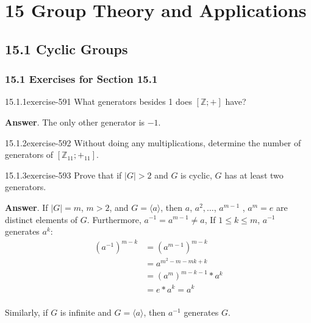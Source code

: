 \documentclass[twoside,10pt,]{book}
\numberwithin{equation}{section}
\begin{document}
\chapter*{15 Group Theory and Applications}
\section*{15.1 Cyclic Groups}
\subsection*{15.1 Exercises for Section 15.1}
\begin{divisionsolution}{15.1.1}{}{exercise-591}%
\hypertarget{p-5333}{}%
What generators besides 1 does \([\mathbb{Z}; +]\) have?%
\par\smallskip%
\noindent\textbf{Answer}.\quad%
\hypertarget{p-5334}{}%
The only other generator is \(-1\).%
\end{divisionsolution}%
\begin{divisionsolution}{15.1.2}{}{exercise-592}%
\hypertarget{p-5335}{}%
Without doing any multiplications, determine the number of generators of  \([\mathbb{Z}_{11}; +_{11}]\).%
\end{divisionsolution}%
\begin{divisionsolution}{15.1.3}{}{exercise-593}%
\hypertarget{p-5336}{}%
Prove that if \(\lvert G \rvert >2\) and \(G\) is cyclic, \(G\) has at least two generators.%
\par\smallskip%
\noindent\textbf{Answer}.\quad%
\hypertarget{p-5337}{}%
If  \(\lvert G \rvert = m\), \(m>2\), and \(G = \langle a \rangle\), then \(a\), \(a^2,\ldots\), \(a^{m-1}\) , \(a^m=e\) are distinct elements of \(G\). Furthermore, \(a^{-1}= a^{m-1}\neq a\),  If \(1 \leq k \leq m\), \(a^{-1}\) generates \(a^k\):%
\begin{equation*}
\begin{split}
\left(a^{-1}\right)^{m-k} &= \left(a^{m-1}\right)^{m-k}\\
& = a^{m^2-m-m k + k}\\
& =\left(a^m\right)^{m-k-1}*a^k\\
&= e*a^k=a^k\\
\end{split}
\end{equation*}
%
\par
\hypertarget{p-5338}{}%
Similarly, if \(G\) is infinite and \(G = \langle a\rangle\), then \(a^{-1}\) generates \(G\).%
\end{divisionsolution}%
\end{document}
